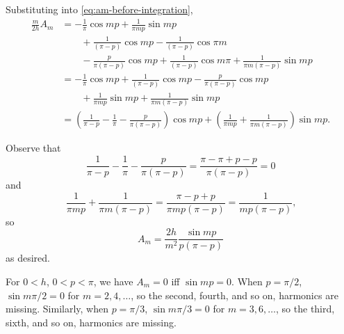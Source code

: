 \documentclass[oneside]{article}
\begin{document}
  Substituting into \eqref{eq:am-before-integration},\begin{align*}
    \frac{m}{2h}A_m &= -\frac{1}{\pi}\cos mp + \frac{1}{\pi mp} \sin mp \\
    &\qquad+\frac{1}{(\pi - p)}\cos mp - \frac{1}{(\pi - p)}\cos \pi m \\
    &\qquad-\frac{p}{\pi(\pi - p)}\cos mp
      + \frac{1}{(\pi - p)}\cos m\pi
      + \frac{1}{\pi m(\pi - p)}\sin mp \\
    &= -\frac{1}{\pi}\cos mp +\frac{1}{(\pi - p)}\cos mp
      -\frac{p}{\pi(\pi - p)}\cos mp \\
    &\qquad
      + \frac{1}{\pi mp} \sin mp + \frac{1}{\pi m(\pi - p)}\sin mp \\
    &= \left(\frac{1}{\pi-p} - \frac{1}{\pi} - \frac{p}{\pi(\pi-p)}\right)
        \cos mp
       + \left( \frac{1}{\pi mp} + \frac{1}{\pi m(\pi-p)} \right) \sin mp
       \text{.}
  \end{align*}

  Observe that \[
    \frac{1}{\pi-p} - \frac{1}{\pi} - \frac{p}{\pi(\pi-p)}
    = \frac{\pi-\pi+p-p}{\pi(\pi-p)} = 0
  \] and
  \[
    \frac{1}{\pi mp} + \frac{1}{\pi m(\pi-p)}
    = \frac{\pi - p + p}{\pi mp(\pi-p)}
    =\frac{1}{mp(\pi-p)} \text{,}
  \] so \[
    A_m = \frac{2h}{m^2}\frac{\sin mp}{p(\pi-p)}
  \] as desired.

  For $0 < h$, $0 < p < \pi$, we have $A_m = 0$ iff $\sin mp = 0$. When
  $p = \pi/2$, $\sin m\pi/2 = 0$ for $m = 2,4,\dots$, so the second, fourth, and
  so on, harmonics are missing. Similarly, when $p = \pi/3$, $\sin m\pi/3 = 0$
  for $m = 3,6,\dots$, so the third, sixth, and so on, harmonics are missing.
\end{document}
